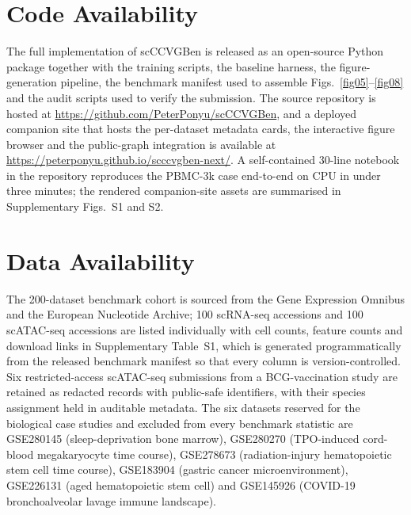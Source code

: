 \documentclass[referee, pdflatex, sn-vancouver-num]{sn-jnl}
\begin{document}
\section*{Code Availability}

The full implementation of scCCVGBen is released as an open-source Python package together with the training scripts, the baseline harness, the figure-generation pipeline, the benchmark manifest used to assemble Figs.~\ref{fig05}--\ref{fig08} and the audit scripts used to verify the submission. The source repository is hosted at \url{https://github.com/PeterPonyu/scCCVGBen}, and a deployed companion site that hosts the per-dataset metadata cards, the interactive figure browser and the public-graph integration is available at \url{https://peterponyu.github.io/scccvgben-next/}. A self-contained 30-line notebook in the repository reproduces the PBMC-3k case end-to-end on CPU in under three minutes; the rendered companion-site assets are summarised in Supplementary Figs.~S1 and S2.

\section*{Data Availability}

The 200-dataset benchmark cohort is sourced from the Gene Expression Omnibus and the European Nucleotide Archive; 100 scRNA-seq accessions and 100 scATAC-seq accessions are listed individually with cell counts, feature counts and download links in Supplementary Table~S1, which is generated programmatically from the released benchmark manifest so that every column is version-controlled. Six restricted-access scATAC-seq submissions from a BCG-vaccination study are retained as redacted records with public-safe identifiers, with their species assignment held in auditable metadata. The six datasets reserved for the biological case studies and excluded from every benchmark statistic are GSE280145 (sleep-deprivation bone marrow), GSE280270 (TPO-induced cord-blood megakaryocyte time course), GSE278673 (radiation-injury hematopoietic stem cell time course), GSE183904 (gastric cancer microenvironment), GSE226131 (aged hematopoietic stem cell) and GSE145926 (COVID-19 bronchoalveolar lavage immune landscape).

\end{document}
